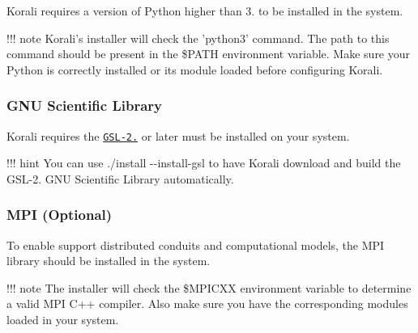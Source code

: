 Korali requires a version of Python higher than 3. to be installed in the system.

!!! note Korali's installer will check the 'python3' command. The path to this command should be present in the \$\-P\-A\-T\-H environment variable. Make sure your Python is correctly installed or its module loaded before configuring Korali.

\subsubsection*{G\-N\-U Scientific Library}

Korali requires the \href{http://www.gnu.org/software/gsl/}{\tt G\-S\-L-\/2.} or later must be installed on your system.

!!! hint You can use {\ttfamily ./install -\/-\/install-\/gsl} to have Korali download and build the G\-S\-L-\/2. G\-N\-U Scientific Library automatically.

\subsubsection*{M\-P\-I (Optional)}

To enable support distributed conduits and computational models, the M\-P\-I library should be installed in the system.

!!! note The installer will check the \$\-M\-P\-I\-C\-X\-X environment variable to determine a valid M\-P\-I C++ compiler. Also make sure you have the corresponding modules loaded in your system. 